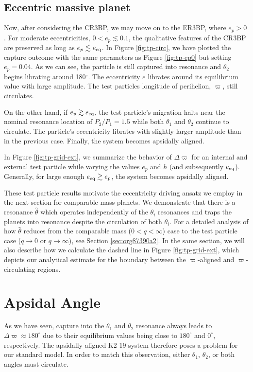 \documentclass[usenatbib,twocolumn]{mnras}
\begin{document}
\subsection{Eccentric massive planet}
\label{sec:org766020c}
Now, after considering the
CR3BP, we may move on to the ER3BP, where \(e_p>0\).  For moderate
eccentricities, \(0<e_p\lesssim 0.1\), the qualitative features of the
CR3BP are preserved as long as \(e_p \lesssim e_{\rm eq}\). In Figure
\ref{fig:tp-circ}, we have plotted the capture outcome with the same
parameters as Figure \ref{fig:tp-ep0} but setting \(e_p = 0.04\). As we
can see, the particle is still captured into resonance and \(\theta_2\)
begins librating around 180\(^\circ\). The eccentricity \(e\) librates
around its equilibrium value with large amplitude. The test particles
longitude of perihelion, \(\varpi\), still circulates.

On the other hand, if \(e_p \gtrsim e_{\rm eq}\), the test particle's
migration halts near the nominal resonance location of \(P_2/P_1=1.5\)
while both \(\theta_1\) and \(\theta_2\) continue to circulate. The particle's
eccentricity librates with slightly larger amplitude than
in the previous case. Finally, the system becomes apsidally aligned.

In Figure \ref{fig:tp-grid-ext}, we summarize the behavior of
\(\Delta\varpi\) for an internal and external test particle while
varying the values \(e_p\) and \(h\) (and subsequently \(e_{\rm
eq}\)). Generally, for large enough \(e_{\rm eq}\gtrsim e_p\), the system
becomes apsidally aligned.

These test particle results motivate the eccentricity driving ansatz
we employ in the next section for comparable mass planets. We
demonstrate that there is a resonance \(\hat\theta\) which operates
independently of the \(\theta_i\) resonances and traps the planets into
resonance despite the circulation of both \(\theta_i\). For a detailed
analysis of how \(\hat\theta\) reduces from the comparable mass
(\(0<q<\infty\)) case to the test particle case (\(q\to0\) or
\(q\to\infty\)), see Section \ref{sec:org87390a2}. In the same section,
we will also describe how we calculate the dashed line in Figure
\ref{fig:tp-grid-ext}, which depicts our analytical estimate for the
boundary between the $\varpi$-aligned and $\varpi$-circulating
regions.

\section{Apsidal Angle}
\label{sec:org539d507}
As we have seen, capture into the \(\theta_1\) and \(\theta_2\) resonance
always leads to \(\Delta\varpi\approx 180^\circ\) due to their
equilibrium values being close to \(180^\circ\) and \(0^\circ\),
respectively.  The apsidally aligned K2-19 system therefore poses a
problem for our standard model.  In order to match this observation,
either \(\theta_1\), \(\theta_2\), or both angles must circulate.
\end{document}
